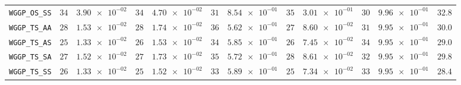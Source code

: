 \begin{xltabular}{\textwidth}{l||cC|cC|cC|cC|cC||c}
	\texttt{WGGP\_OS\_SS} & $ 34$ & $ \num{3.90e-02}$ & $ 34$ & $ \num{4.70e-02}$ & $ 31$ & $ \num{8.54e-01}$ & $ 35$ & $ \num{3.01e-01}$ & $ 30$ & $ \num{9.96e-01}$ & $ 32.8$  \\
	\texttt{WGGP\_TS\_AA} & $ 28$ & $ \num{1.53e-02}$ & $ 28$ & $ \num{1.74e-02}$ & $ 36$ & $ \num{5.62e-01}$ & $ 27$ & $ \num{8.60e-02}$ & $ 31$ & $ \num{9.95e-01}$ & $ 30.0$  \\
	\texttt{WGGP\_TS\_AS} & $ 25$ & $ \num{1.33e-02}$ & $ 26$ & $ \num{1.53e-02}$ & $ 34$ & $ \num{5.85e-01}$ & $ 26$ & $ \num{7.45e-02}$ & $ 34$ & $ \num{9.95e-01}$ & $ 29.0$  \\
	\texttt{WGGP\_TS\_SA} & $ 27$ & $ \num{1.52e-02}$ & $ 27$ & $ \num{1.73e-02}$ & $ 35$ & $ \num{5.72e-01}$ & $ 28$ & $ \num{8.61e-02}$ & $ 32$ & $ \num{9.95e-01}$ & $ 29.8$  \\
	\texttt{WGGP\_TS\_SS} & $ 26$ & $ \num{1.33e-02}$ & $ 25$ & $ \num{1.52e-02}$ & $ 33$ & $ \num{5.89e-01}$ & $ 25$ & $ \num{7.34e-02}$ & $ 33$ & $ \num{9.95e-01}$ & $ 28.4$  \\
\end{xltabular}
